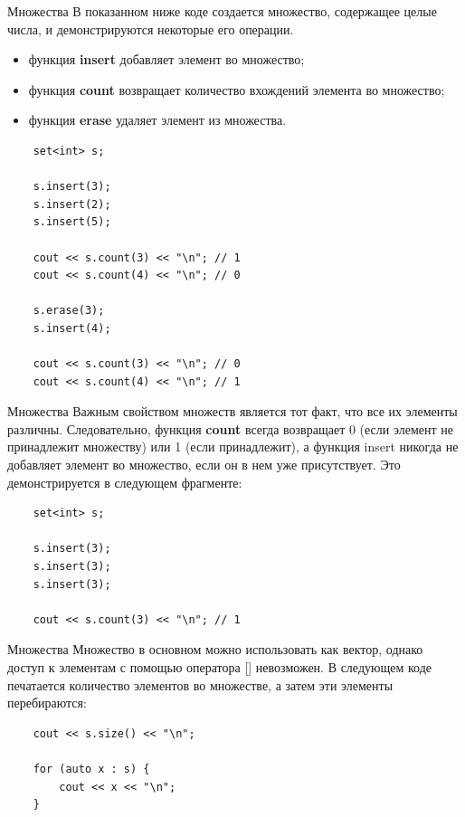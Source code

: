 \documentclass{beamer}
\begin{document}
\begin{frame}[fragile]{Множества}
    В показанном ниже коде создается множество, содержащее целые числа, и демонстрируются некоторые его операции. 
    \begin{itemize}
        \item функция \textbf{insert} добавляет элемент во множество; 
        \item функция \textbf{count} возвращает количество вхождений элемента во множество;
        \item функция \textbf{erase} удаляет элемент из множества.
    \end{itemize}
    
    \begin{verbatim}
    set<int> s;
    
    s.insert(3);
    s.insert(2);
    s.insert(5);
    
    cout << s.count(3) << "\n"; // 1
    cout << s.count(4) << "\n"; // 0
    
    s.erase(3);
    s.insert(4);
    
    cout << s.count(3) << "\n"; // 0
    cout << s.count(4) << "\n"; // 1
    \end{verbatim}
\end{frame}

\begin{frame}[fragile]{Множества}
    Важным свойством множеств является тот факт, что все их элементы различны. Следовательно, функция \textbf{count} всегда возвращает 0 (если элемент не принадлежит множеству) или 1 (если принадлежит), а функция insert никогда не добавляет элемент во множество, если он в нем уже присутствует. Это демонстрируется в следующем фрагменте:

    \begin{verbatim}
    set<int> s;
    
    s.insert(3);
    s.insert(3);
    s.insert(3);
    
    cout << s.count(3) << "\n"; // 1
    \end{verbatim}
\end{frame}

\begin{frame}[fragile]{Множества}
    Множество в основном можно использовать как вектор, однако доступ к элементам с помощью оператора [] невозможен. В следующем коде печатается количество элементов во множестве, а затем эти элементы перебираются:
    \begin{verbatim}
    cout << s.size() << "\n";
    
    for (auto x : s) {
        cout << x << "\n";
    }
    \end{verbatim}
\end{frame}
\end{document}

